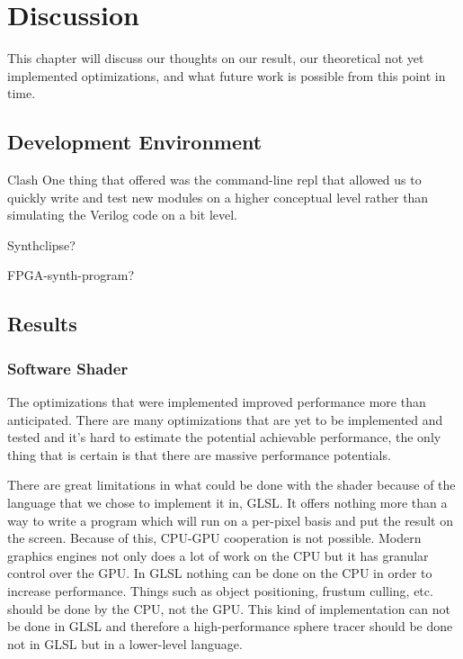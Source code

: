 \chapter{Discussion} 

	This chapter will discuss our thoughts on our result, our theoretical not
	yet	implemented optimizations, and what future work is possible from this
	point in time.
	
	\section{Development Environment}
	
		Clash
		One thing that \clash offered was the command-line repl that allowed us to quickly
		write and test new modules on a higher conceptual level rather than
		simulating the Verilog code on a bit level. 
	
		Synthclipse?
		
		
		FPGA-synth-program?
	
	\section{Results} \label{discussion}
		
		\subsection{Software Shader}

			The optimizations that were implemented improved performance more
			than anticipated. There are many optimizations that are yet to be
			implemented and tested and it's hard to estimate the potential
			achievable performance, the only thing that is certain is that
			there are massive performance potentials.

			There are great limitations in what could be done with the shader
			because of the language that we chose to implement it in, GLSL. It
			offers nothing more than a way to write a program which will run on
			a per-pixel basis and put the result on the screen. Because of
			this, CPU-GPU cooperation is not possible. Modern graphics engines 
			not only does a lot of work on the CPU but it has granular control 
			over the GPU. In GLSL nothing can be done on the CPU in order to 
			increase performance. Things such as object positioning, frustum 
			culling, etc. should be done by the CPU, not the GPU. This kind of 
			implementation can not be done in GLSL and therefore a 
			high-performance sphere tracer should be done not in GLSL but in a 
			lower-level language.

